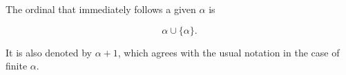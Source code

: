 The ordinal that immediately follows a given $\alpha$ is

$$\alpha \cup \{\alpha\}.$$

It is also denoted by $\alpha + 1$, which agrees with the usual notation in the case of finite $\alpha$.
